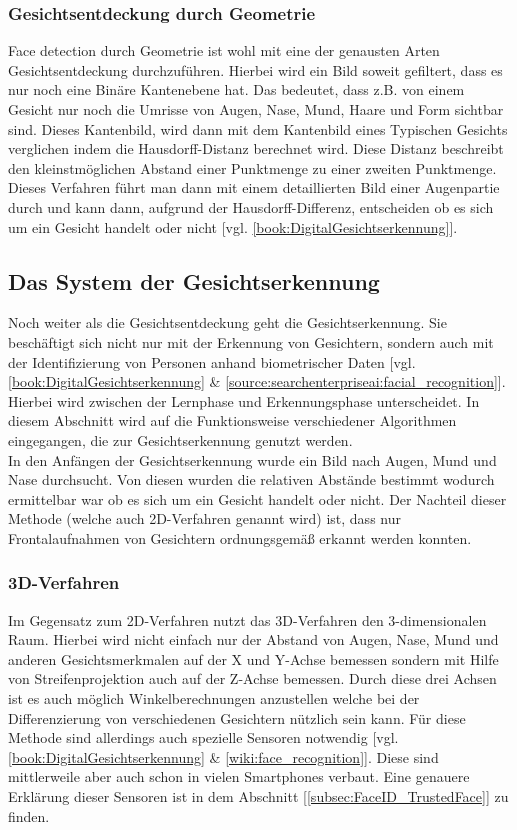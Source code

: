         \subsubsection{Gesichtsentdeckung durch Geometrie}
        \label{subsubsec:face_detectiom_with_geometry}
            Face detection durch Geometrie ist wohl mit eine der genausten Arten Gesichtsentdeckung durchzuführen. Hierbei wird ein Bild soweit gefiltert, dass es nur noch eine Binäre Kantenebene hat. Das bedeutet, dass z.B. von einem Gesicht nur noch die Umrisse von Augen, Nase, Mund, Haare und Form sichtbar sind. Dieses Kantenbild, wird dann mit dem Kantenbild eines Typischen Gesichts verglichen indem die Hausdorff-Distanz berechnet wird. Diese Distanz beschreibt den kleinstmöglichen Abstand einer Punktmenge zu einer zweiten Punktmenge. Dieses Verfahren führt man dann mit einem detaillierten Bild einer Augenpartie durch und kann dann, aufgrund der Hausdorff-Differenz, entscheiden ob es sich um ein Gesicht handelt oder nicht [vgl. \ref{book:DigitalGesichtserkennung}].
            
    \subsection{Das System der Gesichtserkennung}
    \label{subsec:system_of_face_recognition}
        Noch weiter als die Gesichtsentdeckung geht die Gesichtserkennung. Sie beschäftigt sich nicht nur mit der Erkennung von Gesichtern, sondern auch mit der Identifizierung von Personen anhand biometrischer Daten [vgl. \ref{book:DigitalGesichtserkennung} \& \ref{source:searchenterpriseai:facial_recognition}]. Hierbei wird zwischen der Lernphase und Erkennungsphase unterscheidet. In diesem Abschnitt wird auf die Funktionsweise verschiedener Algorithmen eingegangen, die zur Gesichtserkennung genutzt werden.\\
        In den Anfängen der Gesichtserkennung wurde ein Bild nach Augen, Mund und Nase durchsucht. Von diesen wurden die relativen Abstände bestimmt wodurch ermittelbar war ob es sich um ein Gesicht handelt oder nicht. Der Nachteil dieser Methode (welche auch 2D-Verfahren genannt wird) ist, dass nur Frontalaufnahmen von Gesichtern ordnungsgemäß erkannt werden konnten.

        \subsubsection{3D-Verfahren}
        \label{subsubsec:3d_verfahren}
            Im Gegensatz zum 2D-Verfahren nutzt das 3D-Verfahren den 3-dimensionalen Raum. Hierbei wird nicht einfach nur der Abstand von Augen, Nase, Mund und anderen Gesichtsmerkmalen auf der X und Y-Achse bemessen sondern mit Hilfe von Streifenprojektion auch auf der Z-Achse bemessen. Durch diese drei Achsen ist es auch möglich Winkelberechnungen anzustellen welche bei der Differenzierung von verschiedenen Gesichtern nützlich sein kann. Für diese Methode sind allerdings auch spezielle Sensoren notwendig [vgl. \ref{book:DigitalGesichtserkennung} \& \ref{wiki:face_recognition}]. Diese sind mittlerweile aber auch schon in vielen Smartphones verbaut. Eine genauere Erklärung dieser Sensoren ist in dem Abschnitt [\ref{subsec:FaceID_TrustedFace}] zu finden.

